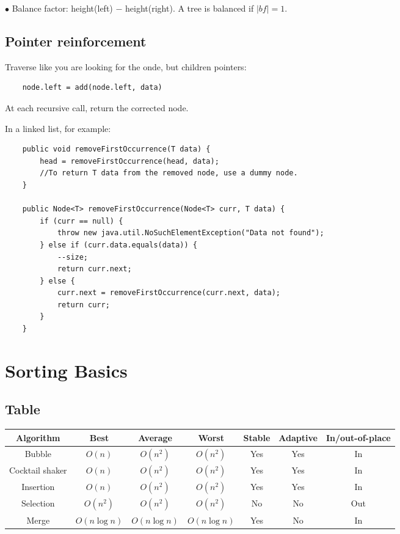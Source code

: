 \documentclass[english,openany]{book}
\begin{document}
    $\bullet$ Balance factor: height(left) $-$ height(right). A tree is balanced if $|bf| = 1$.\\

    \newpage
    \section{Pointer reinforcement}

    Traverse like you are looking for the onde, but children pointers:
    \begin{lstlisting}
    node.left = add(node.left, data)
    \end{lstlisting}

    At each recursive call, return the corrected node.

    In a linked list, for example:

    \begin{lstlisting}
    public void removeFirstOccurrence(T data) {
        head = removeFirstOccurrence(head, data);
        //To return T data from the removed node, use a dummy node.
    }

    public Node<T> removeFirstOccurrence(Node<T> curr, T data) {
        if (curr == null) {
            throw new java.util.NoSuchElementException("Data not found");
        } else if (curr.data.equals(data)) {
            --size;
            return curr.next;
        } else {
            curr.next = removeFirstOccurrence(curr.next, data);
            return curr;
        }
    }
    \end{lstlisting}


    \chapter{Sorting Basics}

    \section{Table}

    \begin{tabular}{c|cccccc}
        Algorithm&Best&Average&Worst&Stable&Adaptive&In/out-of-place\\
        \hline
        Bubble&$O(n)$&$O(n^2)$&$O(n^2)$&Yes&Yes&In\\
        Cocktail shaker&$O(n)$&$O(n^2)$&$O(n^2)$&Yes&Yes&In\\
        Insertion&$O(n)$&$O(n^2)$&$O(n^2)$&Yes&Yes&In\\
        Selection&$O(n^2)$&$O(n^2)$&$O(n^2)$&No&No&Out\\
        Merge&$O(n \log n)$&$O(n \log n)$&$O(n \log n)$&Yes&No&In
    \end{tabular}
\end{document}
